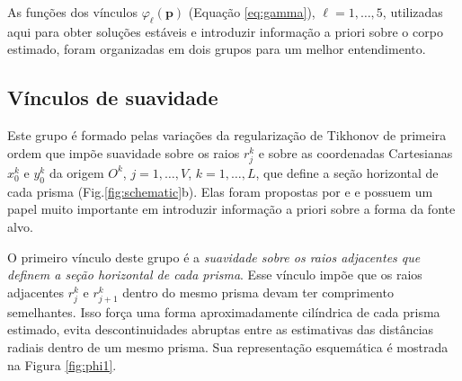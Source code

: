As funções dos vínculos $\varphi_{\ell}(\mathbf{p})$ (Equação \ref{eq:gamma}), $\ell = 1, \dots, 5$, utilizadas aqui para obter soluções estáveis e introduzir informação a priori sobre o corpo estimado, foram organizadas em dois grupos para um melhor entendimento.

\subsection{Vínculos de suavidade}

Este grupo é formado pelas variações da regularização de Tikhonov de primeira ordem \cite[][ p. 103]{aster_etal2019} que impõe suavidade sobre os raios $r_{j}^{k}$ e sobre as coordenadas Cartesianas $x_{0}^{k}$ e $y_{0}^{k}$ da origem $O^{k}$, $j = 1, \dots, V$, $k = 1, \dots, L$, que define a seção horizontal de cada prisma (Fig.\ref{fig:schematic}b).
Elas foram propostas por \cite{oliveirajr_etal2011} e \cite{oliveirajr_barbosa2013} e possuem um papel muito importante em introduzir informação a priori sobre a forma da fonte alvo. 

O primeiro vínculo deste grupo é a \textit{suavidade sobre os raios adjacentes que definem a seção horizontal de cada prisma}. Esse vínculo impõe que os raios adjacentes $r_{j}^{k}$ e $r_{j+1}^{k}$ dentro do mesmo prisma devam ter comprimento semelhantes. Isso força uma forma aproximadamente cilíndrica de cada prisma estimado, evita descontinuidades abruptas entre as estimativas das distâncias radiais dentro de um mesmo prisma. Sua representação esquemática é mostrada na Figura \ref{fig:phi1}.

